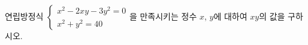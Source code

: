 연립방정식 $\begin{cases} x^2-2xy-3y^2=0 \\ x^2+y^2=40 \end{cases}$을 만족시키는 정수 $x$, $y$에 대하여 $xy$의 값을 구하시오.
